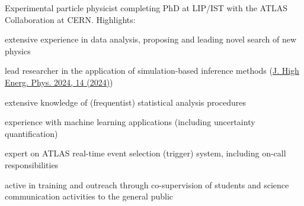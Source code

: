 
Experimental particle physicist completing PhD at LIP/IST with the ATLAS Collaboration at CERN. Highlights:

\begin{cvitems}
    \item[]\vspace{-0.5\baselineskip}
    \item extensive experience in data analysis, proposing and leading novel search of new physics
    \item lead researcher in the application of simulation-based inference methods (\href{https://doi.org/10.1007/JHEP04(2024)014}{J. High Energ. Phys. 2024, 14 (2024)})
    \item extensive knowledge of (frequentist) statistical analysis procedures
    \item experience with machine learning applications (including uncertainty quantification)
    \item expert on ATLAS real-time event selection (trigger) system, including on-call responsibilities
    \item active in training and outreach through co-supervision of students and science communication activities to the general public
    \item[]\vspace{-0.5\baselineskip}
\end{cvitems}